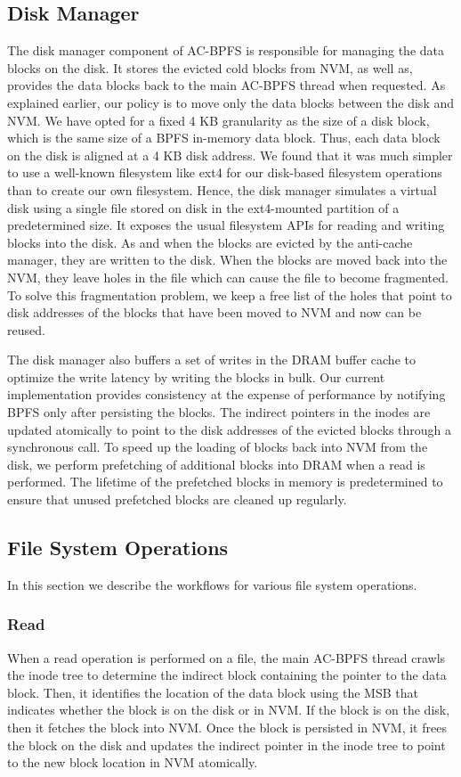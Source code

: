\subsection{Disk Manager}
The disk manager component of AC-BPFS is responsible for managing the data blocks on the disk. It stores the evicted cold blocks from NVM, as well as, provides the data blocks back to the main AC-BPFS thread when requested. As explained earlier, our policy is to move only the data blocks between the disk and NVM. We have opted for a fixed 4 KB granularity as the size of a disk block, which is the same size of a BPFS in-memory data block. Thus, each data block on the disk is aligned at a 4 KB disk address. We found that it was much simpler to use a well-known filesystem like ext4 for our disk-based filesystem operations than to create our own filesystem. Hence, the disk manager simulates a virtual disk using a single file stored on disk in the ext4-mounted partition of a predetermined size. It exposes the usual filesystem APIs for reading and writing blocks into the disk. As and when the blocks are evicted by the anti-cache manager, they are written to the disk. When the blocks are moved back into the NVM, they leave holes in the file which can cause the file to become fragmented. To solve this fragmentation problem, we keep a free list of the holes that point to disk addresses of the blocks that have been moved to NVM and now can be reused.

The disk manager also buffers a set of writes in the DRAM buffer cache to optimize the write latency by writing the blocks in bulk. Our current implementation provides consistency at the expense of performance by notifying BPFS only after persisting the blocks. The indirect pointers in the inodes are updated atomically to point to the disk addresses of the evicted blocks through a synchronous call. To speed up the loading of blocks back into NVM from the disk, we perform prefetching of additional blocks into DRAM when a read is performed. The lifetime of the prefetched blocks in memory is predetermined to ensure that unused prefetched blocks are cleaned up regularly.

\subsection{File System Operations}
In this section we describe the workflows for various file system operations.
\subsubsection{Read}
When a read operation is performed on a file, the main AC-BPFS thread crawls the inode tree to determine the indirect block containing the pointer to the data block. Then, it identifies the location of the data block using the MSB that indicates whether the block is on the disk or in NVM. If the block is on the disk, then it fetches the block into NVM. Once the block is persisted in NVM, it frees the block on the disk and updates the indirect pointer in the inode tree to point to the new block location in NVM atomically.

